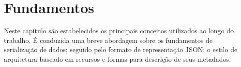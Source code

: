 \chapter{Fundamentos}

Neste capítulo são estabelecidos os principais conceitos utilizados ao longo do trabalho. É conduzida uma breve abordagem sobre os fundamentos de serialização de dados; seguido pelo formato de representação JSON; o estilo de arquitetura baseado em recursos e formas para descrição de seus metadados.






